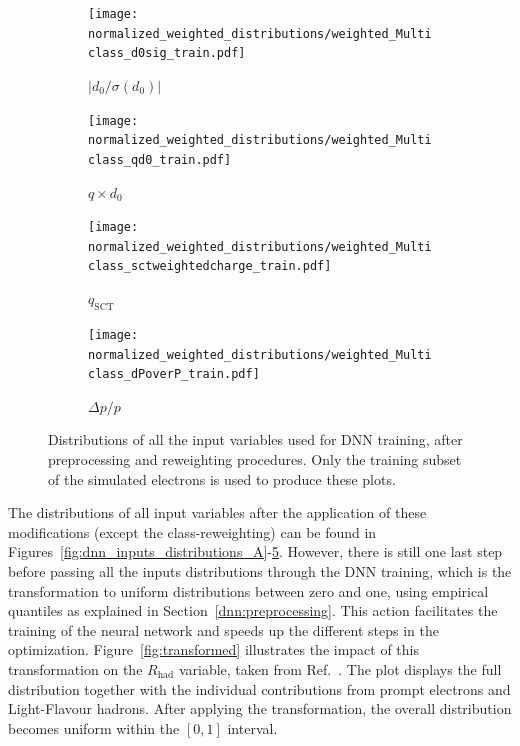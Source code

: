 \begin{figure}[htbp]
  \centering

  \begin{subfigure}[b]{0.49\textwidth}
    \centering
    \texttt{[image: normalized\_weighted\_distributions/weighted\_Multiclass\_d0sig\_train.pdf]}
    \caption{$|d_0/\sigma(d_0)|$}
    \label{fig:input16}
  \end{subfigure}\hfill
  \begin{subfigure}[b]{0.49\textwidth}
    \centering
    \texttt{[image: normalized\_weighted\_distributions/weighted\_Multiclass\_qd0\_train.pdf]}
    \caption{$q \times d_0$}
    \label{fig:input14}
  \end{subfigure}

  \vspace{0.45cm}

  \begin{subfigure}[b]{0.49\textwidth}
    \centering
    \texttt{[image: normalized\_weighted\_distributions/weighted\_Multiclass\_sctweightedcharge\_train.pdf]}
    \caption{$q_{\text{SCT}}$}
    \label{fig:input15}
  \end{subfigure}\hfill
  \begin{subfigure}[b]{0.49\textwidth}
    \centering
    \texttt{[image: normalized\_weighted\_distributions/weighted\_Multiclass\_dPoverP\_train.pdf]}
    \caption{$\Delta p/p$}
    \label{fig:input17}
  \end{subfigure}

  \caption{Distributions of all the input variables used for DNN training, after preprocessing and reweighting procedures. Only the training subset of the simulated electrons is used to produce these plots.}
  \label{fig:dnn_inputs_distributions_C}
\end{figure}

The distributions of all input variables after the application of these modifications (except the class-reweighting) can be found in Figures~\ref{fig:dnn_inputs_distributions_A}-\ref{fig:dnn_inputs_distributions_C}. However, there is still one last step before passing all the inputs distributions through the DNN training, which is the transformation to uniform distributions between zero and one, using empirical quantiles as explained in Section~\ref{dnn:preprocessing}. This action facilitates the training of the neural network and speeds up the different steps in the optimization.
Figure~\ref{fig:transformed} illustrates the impact of this transformation on the $R_{\text{had}}$ variable, taken from Ref.~\cite{dnn_paper}. The plot displays the full distribution together with the individual contributions from prompt electrons and Light-Flavour hadrons. After applying the transformation, the overall distribution becomes uniform within the $[0,1]$ interval.

